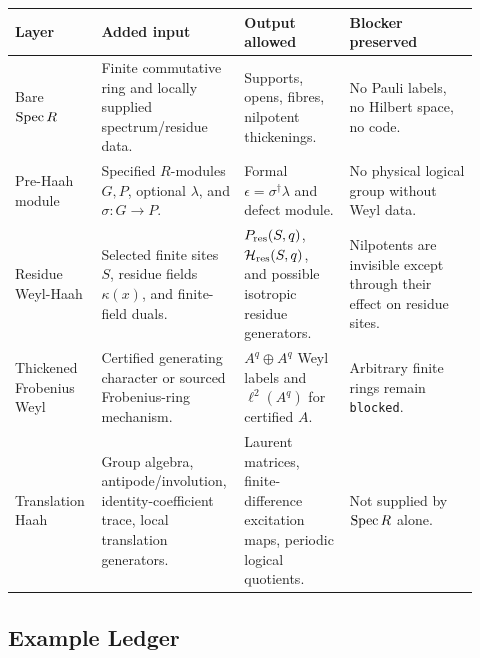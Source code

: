 \begin{center}
\scriptsize\setlength{\tabcolsep}{3pt}
\begin{tabular}{p{0.18\linewidth}p{0.25\linewidth}p{0.22\linewidth}p{0.27\linewidth}}
\toprule
Layer & Added input & Output allowed & Blocker preserved \\
\midrule
Bare \(\operatorname{Spec} R\) &
Finite commutative ring and locally supplied spectrum/residue data. &
Supports, opens, fibres, nilpotent thickenings. &
No Pauli labels, no Hilbert space, no code. \\
Pre-Haah module &
Specified \(R\)-modules \(G,P\), optional \(\lambda\), and
\(\sigma:G\to P\). &
Formal \(\epsilon=\sigma^\dagger\lambda\) and defect module. &
No physical logical group without Weyl data. \\
Residue Weyl-Haah &
Selected finite sites \(S\), residue fields \(\kappa(x)\), and
finite-field duals. &
\(P_{\rm res}(S,q)\), \(\mathcal H_{\rm res}(S,q)\), and possible
isotropic residue generators. &
Nilpotents are invisible except through their effect on residue sites. \\
Thickened Frobenius Weyl &
Certified generating character or sourced Frobenius-ring mechanism. &
\(A^q\oplus A^q\) Weyl labels and \(\ell^2(A^q)\) for certified \(A\). &
Arbitrary finite rings remain \texttt{blocked}. \\
Translation Haah &
Group algebra, antipode/involution, identity-coefficient trace, local
translation generators. &
Laurent matrices, finite-difference excitation maps, periodic logical
quotients. &
Not supplied by \(\operatorname{Spec} R\) alone. \\
\bottomrule
\end{tabular}
\end{center}

\subsection{Example Ledger}

